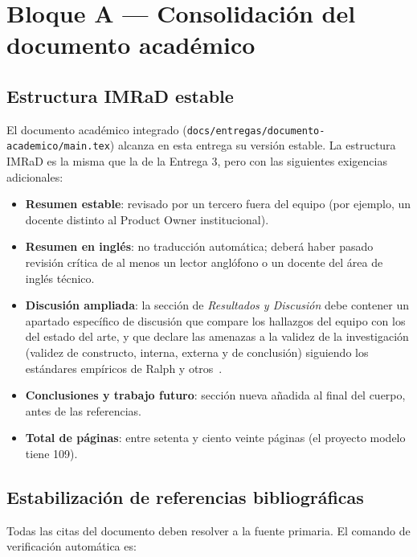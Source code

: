 \documentclass[11pt,a4paper]{article}
\begin{document}
\section{Bloque A --- Consolidaci\'on del documento acad\'emico}

\subsection{Estructura IMRaD estable}

El documento acad\'emico integrado (\texttt{docs/entregas/documento-academico/main.tex}) alcanza en esta entrega su versi\'on estable. La estructura IMRaD es la misma que la de la Entrega 3, pero con las siguientes exigencias adicionales:

\begin{itemize}
    \item \textbf{Resumen estable}: revisado por un tercero fuera del equipo (por ejemplo, un docente distinto al Product Owner institucional).
    \item \textbf{Resumen en ingl\'es}: no traducci\'on autom\'atica; deber\'a haber pasado revisi\'on cr\'itica de al menos un lector angl\'ofono o un docente del \'area de ingl\'es t\'ecnico.
    \item \textbf{Discusi\'on ampliada}: la secci\'on de \emph{Resultados y Discusi\'on} debe contener un apartado espec\'ifico de discusi\'on que compare los hallazgos del equipo con los del estado del arte, y que declare las amenazas a la validez de la investigaci\'on (validez de constructo, interna, externa y de conclusi\'on) siguiendo los est\'andares emp\'iricos de Ralph y otros~\cite{ralph2021empirical}.
    \item \textbf{Conclusiones y trabajo futuro}: secci\'on nueva a\~nadida al final del cuerpo, antes de las referencias.
    \item \textbf{Total de p\'aginas}: entre setenta y ciento veinte p\'aginas (el proyecto modelo tiene 109).
\end{itemize}

\subsection{Estabilizaci\'on de referencias bibliogr\'aficas}

Todas las citas del documento deben resolver a la fuente primaria. El comando de verificaci\'on autom\'atica es:
\end{document}
